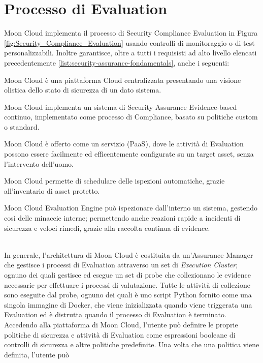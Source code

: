 \section{Processo di Evaluation}
Moon Cloud implementa il processo di Security Compliance Evaluation in Figura \ref{fig:Security_Compliance_Evaluation} usando controlli 
di monitoraggio o di test personalizzabili. Inoltre garantisce, oltre a tutti i requisisti ad alto livello elencati precedentemente 
\ref{list:security-assurance-fondamentals}, anche i seguenti:
\begin{description}
	\item Moon Cloud è una piattaforma Cloud centralizzata presentando una visione olistica dello stato di sicurezza di un dato sistema.
	\item Moon Cloud implementa un sistema di Security Assurance Evidence-based continuo, implementato come processo di Compliance,
	basato su politiche custom o standard.
	\item Moon Cloud è offerto come un servizio (PaaS), dove le attività di Evaluation possono essere facilmente ed efficentemente 
	configurate su un target asset, senza l'intervento dell'uomo.
	\item Moon Cloud permette di schedulare delle ispezioni automatiche, grazie all'inventario di asset protetto.
	\item Moon Cloud Evaluation Engine può ispezionare dall'interno un sistema, gestendo così delle minaccie interne; permettendo anche 
	reazioni rapide a incidenti di sicurezza e veloci rimedi, grazie alla raccolta continua di evidence. 
\end{description}
\ \\
In generale, l'architettura di Moon Cloud è costituita da un'Assurance Manager che gestisce i processi di Evaluation attraverso un set di 
\textit{Execution Cluster}; ognuno dei quali gestisce ed esegue un set di probe che collezionano le evidence necessarie per effettuare 
i processi di valutazione.
Tutte le attività di collezione sono eseguite dal probe, ognuno dei quali è uno script Python fornito come una singola immagine di Docker, 
che viene inizializzata quando viene triggerata una Evaluation ed è distrutta quando il processo di Evaluation è terminato.\\
Accedendo alla piattaforma di Moon Cloud, l'utente può definire le proprie politiche di sicurezza e attività di Evaluation come 
espressioni booleane di controlli di sicurezza e altre politiche predefinite. Una volta che una politica viene definita, l'utente può 
